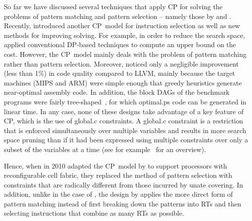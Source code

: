 So far we have discussed several techniques that apply \glsdesc{CP} for solving
the problems of \gls{pattern matching} and \gls{pattern selection} -- namely
those by \citeauthor{Bashford1999} and \citeauthor{Martin2009}.
%
Recently,
\textcite{Beg2013} introduced another \gls{CP}~model for \gls{instruction selection}
as well as new methods for improving solving.
%
For example, in order to reduce
the search space, \citeauthor{Beg2013} applied conventional \gls{DP}-based
techniques to compute an upper bound on the cost.
%
However, the \gls{CP}~model mainly
deals with the problem of \gls{pattern matching} rather than \gls{pattern
  selection}.
%
Moreover, \citeauthor{Beg2013} noticed only a negligible improvement (less than
1\%) in code quality compared to \gls{LLVM}, mainly because the \glspl{target
  machine} (\gls{MIPS} and \gls{ARM}) were simple enough that greedy heuristics
generate near-optimal \gls{assembly code}.  In addition, the \glspl{block DAG}
of the benchmark \glspl{program} were fairly
\gls{tree}-shaped~\cite{VanBeek2014}, for which \gls{optimal.ps} code can be
generated in linear time.
%
In any case, none of these designs take advantage of a key feature of
\glsdesc{CP}, which is the use of \gls{global.c} \glspl{constraint}.
%
A \gls{global.c} \gls{constraint} is a restriction that is enforced
simultaneously over multiple \glspl{variable} and results in more search space
pruning than if it had been expressed using multiple \glspl{constraint} over
only a subset of the variables at a time (see for example~\cite{Beldiceanu2014}
for an overview).

Hence, when \textcite{Floch2010} in 2010 adapted the \gls{CP}~model by
\citeauthor{Martin2009} to support processors with reconfigurable cell fabric,
they replaced the method of \gls{pattern selection} with \glspl{constraint} that are
radically different from those incurred by \gls{unate covering}.
%
In addition,
unlike in the case of \citeauthor{Bashford1999}, the design by
\citeauthor{Floch2010} applies the more direct form of \gls{pattern matching}
instead of first breaking down the \glspl{pattern} into \glspl{RT} and then
selecting \glspl{instruction} that combine as many \glspl{RT} as possible.

